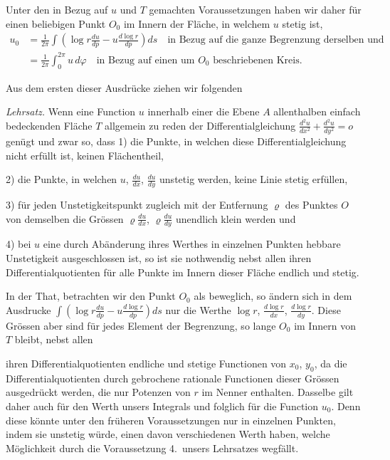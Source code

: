 \documentclass{article}
\begin{document}
Unter den in Bezug auf $u$ und $T$ gemachten Voraussetzungen haben wir daher für einen beliebigen Punkt $O_0$ im Innern der Fläche, in welchem $u$ stetig ist,
\[
\begin{aligned}
u_0 &= \frac{1}{2\pi}\int \left(\log r\frac{du}{dp} - u\frac{d\log r}{dp}\right) ds \quad \text{in Bezug auf die ganze Begrenzung derselben und} \\
&= \frac{1}{2\pi}\int_0^{2\pi} u\,d\varphi \quad \text{in Bezug auf einen um } O_0 \text{ beschriebenen Kreis.}
\end{aligned}
\]

Aus dem ersten dieser Ausdrücke ziehen wir folgenden

\emph{Lehrsatz.} Wenn eine Function $u$ innerhalb einer die Ebene $A$ allenthalben einfach bedeckenden Fläche $T$ allgemein zu reden der Differentialgleichung $\frac{d^2u}{dx^2} + \frac{d^2u}{dy^2} = o$ genügt und zwar so, dass
1) die Punkte, in welchen diese Differentialgleichung nicht erfüllt ist, keinen Flächentheil,


2) die Punkte, in welchen $u$, $\frac{du}{dx}$, $\frac{du}{dy}$ unstetig werden, keine Linie stetig erfüllen,


3) für jeden Unstetigkeitspunkt zugleich mit der Entfernung $\varrho$ des Punktes $O$ von demselben die Grössen $\varrho\frac{du}{dx}$, $\varrho\frac{du}{dy}$ unendlich klein werden und


4) bei $u$ eine durch Abänderung ihres Werthes in einzelnen Punkten hebbare Unstetigkeit ausgeschlossen ist,
so ist sie nothwendig nebst allen ihren Differentialquotienten für alle Punkte im Innern dieser Fläche endlich und stetig.

In der That, betrachten wir den Punkt $O_0$ als beweglich, so ändern sich in dem Ausdrucke $\displaystyle\int \left(\log r\frac{du}{dp} - u\frac{d\log r}{dp}\right) ds$ nur die Werthe $\log r$, $\frac{d\log r}{dx}$, $\frac{d\log r}{dy}$. Diese Grössen aber sind für jedes Element der Begrenzung, so lange $O_0$ im Innern von $T$ bleibt, nebst allen

ihren Differentialquotienten endliche und stetige Functionen von $x_0$, $y_0$, da die Differentialquotienten durch gebrochene rationale Functionen dieser Grössen ausgedrückt werden, die nur Potenzen von $r$ im Nenner enthalten. Dasselbe gilt daher auch für den Werth unsers Integrals und folglich für die Function $u_0$. Denn diese könnte unter den früheren Voraussetzungen nur in einzelnen Punkten, indem sie unstetig würde, einen davon verschiedenen Werth haben, welche Möglichkeit durch die Voraussetzung 4.\ unsers Lehrsatzes wegfällt.
\end{document}
